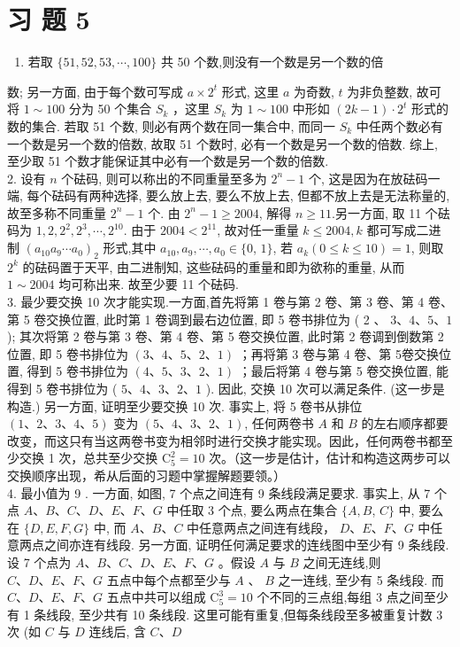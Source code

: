 \documentclass[10pt]{article}
\begin{document}
\section{习 题 5}
\begin{enumerate}
  \item 若取 $\{51,52,53, \cdots, 100\}$ 共 50 个数,则没有一个数是另一个数的倍
\end{enumerate}

数; 另一方面, 由于每个数可写成 $a \times 2^{t}$ 形式, 这里 $a$ 为奇数, $t$ 为非负整数, 故可将 $1 \sim 100$ 分为 50 个集合 $S_{k}$ ，这里 $S_{k}$ 为 $1 \sim 100$ 中形如 $(2 k-1) \cdot 2^{t}$ 形式的数的集合. 若取 51 个数, 则必有两个数在同一集合中, 而同一 $S_{k}$ 中任两个数必有一个数是另一个数的倍数, 故取 51 个数时, 必有一个数是另一个数的倍数. 综上, 至少取 51 个数才能保证其中必有一个数是另一个数的倍数.\\
2. 设有 $n$ 个砝码, 则可以称出的不同重量至多为 $2^{n}-1$ 个, 这是因为在放砝码一端, 每个砝码有两种选择, 要么放上去, 要么不放上去, 但都不放上去是无法称量的,故至多称不同重量 $2^{n}-1$ 个. 由 $2^{n}-1 \geqslant 2004$, 解得 $n \geqslant 11$.另一方面, 取 11 个砝码为 $1,2,2^{2}, 2^{3}, \cdots, 2^{10}$. 由于 $2004<2^{11}$, 故对任一重量 $k \leqslant 2004, k$ 都可写成二进制 $\left(a_{10} a_{9} \cdots a_{0}\right)_{2}$ 形式,其中 $a_{10}, a_{9}, \cdots, a_{0} \in\{0$, $1\}$, 若 $a_{k}(0 \leqslant k \leqslant 10)=1$, 则取 $2^{k}$ 的砝码置于天平, 由二进制知, 这些砝码的重量和即为欲称的重量, 从而 $1 \sim 2004$ 均可称出来. 故至少要 11 个砝码.\\
3. 最少要交换 10 次才能实现.一方面,首先将第 1 卷与第 2 卷、第 3 卷、第 4 卷、第 5 卷交换位置, 此时第 1 卷调到最右边位置, 即 5 卷书排位为 ( 2 、 $3 、 4 、 5 、 1$ ); 其次将第 2 卷与第 3 卷、第 4 卷、第 5 卷交换位置, 此时第 2 卷调到倒数第 2 位置, 即 5 卷书排位为 $(3 、 4 、 5 、 2 、 1)$ ；再将第 3 卷与第 4 卷、第 5卷交换位置, 得到 5 卷书排位为 $(4 、 5 、 3 、 2 、 1)$ ；最后将第 4 卷与第 5 卷交换位置, 能得到 5 卷书排位为 ( $5 、 4 、 3 、 2 、 1$ ). 因此, 交换 10 次可以满足条件. (这一步是构造.) 另一方面, 证明至少要交换 10 次. 事实上, 将 5 卷书从排位 $(1 、 2 、 3 、 4 、 5)$ 变为 $(5 、 4 、 3 、 2 、 1)$, 任何两卷书 $A$ 和 $B$ 的左右顺序都要改变，而这只有当这两卷书变为相邻时进行交换才能实现。因此，任何两卷书都至少交换 1 次，总共至少交换 $\mathrm{C}_{5}^{2}=10$ 次。（这一步是估计，估计和构造这两步可以交换顺序出现，希从后面的习题中掌握解题要领。）\\
4. 最小值为 9 . 一方面, 如图, 7 个点之间连有 9 条线段满足要求. 事实上, 从 7 个点 $A 、 B 、 C 、 D 、 E 、 F 、 G$ 中任取 3 个点, 要么两点在集合 $\{A, B$, $C\}$ 中, 要么在 $\{D, E, F, G\}$ 中, 而 $A 、 B 、 C$ 中任意两点之间连有线段， $D 、 E 、 F 、 G$ 中任意两点之间亦连有线段. 另一方面, 证明任何满足要求的连线图中至少有 9 条线段. 设 7 个点为 $A 、 B 、 C 、 D 、 E 、 F 、 G$ 。假设 $A$ 与 $B$ 之间无连线,则 $C 、 D 、 E 、 F 、 G$ 五点中每个点都至少与 $A$ 、 $B$ 之一连线, 至少有 5 条线段. 而 $C 、 D 、 E 、 F 、 G$ 五点中共可以组成 $\mathrm{C}_{5}^{3}=10$ 个不同的三点组,每组 3 点之间至少有 1 条线段, 至少共有 10 条线段. 这里可能有重复,但每条线段至多被重复计数 3 次 (如 $C$ 与 $D$ 连线后, 含 $C 、 D$
\end{document}

